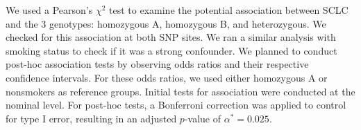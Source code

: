 \documentclass{article}
\begin{document}
	We used a Pearson’s $\chi^2$ test to examine the potential association between SCLC and the 3 genotypes: homozygous A, homozygous B, and heterozygous. We checked for this association at both SNP sites. We ran a similar analysis with smoking status to check if it was a strong confounder. We planned to conduct post-hoc association tests by observing odds ratios and their respective confidence intervals. For these odds ratios, we used either homozygous A or nonsmokers as reference groups. Initial tests for association were conducted at the nominal level. For post-hoc tests, a Bonferroni correction was applied to control for type I error, resulting in an adjusted $p$-value of $\alpha^* = 0.025$.



		
\end{document}
